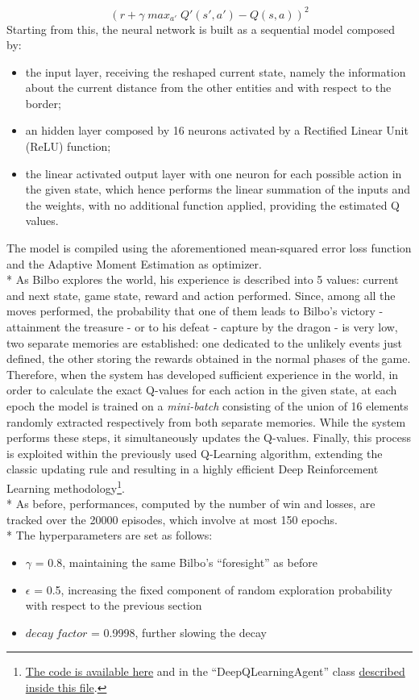 $$(r+\gamma\;max_{a'}\;Q'(s',a')-Q(s,a))^2$$
Starting from this, the neural network is built as a sequential model composed by:
\begin{itemize}[noitemsep, topsep=0ex]
  \item the input layer, receiving the reshaped current state, namely the information about the current distance from the other entities and with respect to the border;
  \item an hidden layer composed by 16 neurons activated by a Rectified Linear Unit (ReLU) function; 
  \item the linear activated output layer with one neuron for each possible action in the given state, which hence performs the linear summation of the inputs and the weights, with no additional function applied, providing the estimated Q values.
\end{itemize}
The model is compiled using the aforementioned mean-squared error loss function and the Adaptive Moment Estimation as optimizer.\\*
As Bilbo explores the world, his experience is described into 5 values: current and next state, game state, reward and action performed. Since, among all the moves performed, the probability that one of them leads to Bilbo's victory - attainment the treasure - or to his defeat - capture by the dragon - is very low, two separate memories are established: one dedicated to the unlikely events just defined, the other storing the rewards obtained in the normal phases of the game. Therefore, when the system has developed sufficient experience in the world, in order to calculate the exact Q-values for each action in the given state, at each epoch the model is trained on a \textit{mini-batch} consisting of the union of 16 elements randomly extracted respectively from both separate memories. While the system performs these steps, it simultaneously updates the Q-values. Finally, this process is exploited within the previously used Q-Learning algorithm, extending the classic updating rule and resulting in a highly efficient Deep Reinforcement Learning methodology\footnote{\href{https://github.com/moiraghif/DragonHunting/blob/master/Bilbo\%20World/Bilbo_deep_feels.py}{The code is available here} and in the ``DeepQLearningAgent'' class \href{https://github.com/moiraghif/DragonHunting/blob/master/Bilbo\%20World/agents.py}{described inside this file}.}.\\*
As before, performances, computed by the number of win and losses, are tracked over the 20000 episodes, which involve at most 150 epochs.\\*
The hyperparameters are set as follows:
\begin{itemize}[noitemsep, topsep=0ex]
  \item $\gamma$ = 0.8, maintaining the same Bilbo's ``foresight'' as before
  \item $\epsilon$ = 0.5, increasing the fixed component of random exploration probability with respect to the previous section
  \item $decay\;factor$ = 0.9998, further slowing the decay
\end{itemize} 

